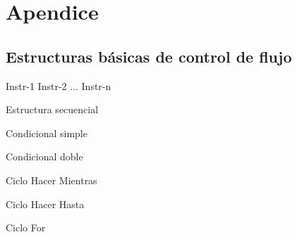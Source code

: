 %
\chapter*{Apendice}

\setcounter{algocf}{0}

\section*{Estructuras básicas de control de flujo}

\begin{algorithm}[H]
 \SetAlgoLined
 Instr-1\;
 Instr-2\;
 ...\;
 Instr-n\;
\caption{Estructura secuencial}
\label{seqstru}
\end{algorithm}

\begin{algorithm}[H]
 \SetAlgoLined
\caption{Condicional simple}
\label{simpleif}
%
\end{algorithm}

\begin{algorithm}[H]
 \SetAlgoLined
{}
\caption{Condicional doble}
\label{doubleif}
%
\end{algorithm}

\newpage

\begin{algorithm}[H]
\SetAlgoLined
{}
\caption{Ciclo Hacer Mientras}
\label{while}
%
\end{algorithm}


\begin{algorithm}[H]
\SetAlgoLined
{}
\caption{Ciclo Hacer Hasta}
\label{until}
%
\end{algorithm}

\begin{algorithm}[H]
\SetAlgoLined
{}
\caption{Ciclo For}
\label{fornext}
%
\end{algorithm}




